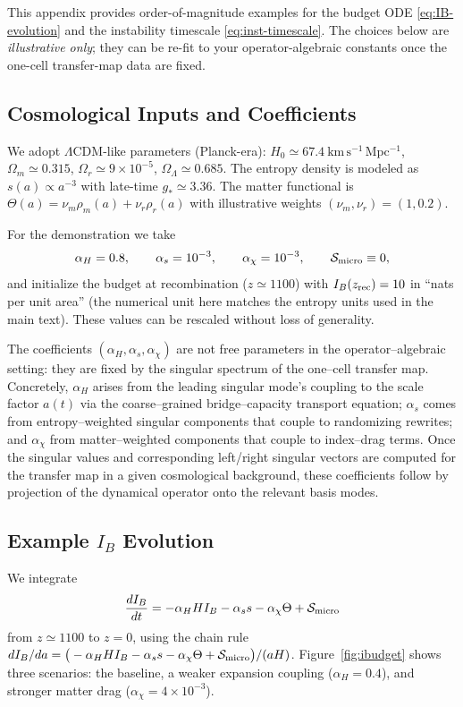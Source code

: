 \documentclass[11pt]{article}
\theoremstyle{plain}
\theoremstyle{definition}
\begin{document}
This appendix provides order-of-magnitude examples for the budget ODE \eqref{eq:IB-evolution} and the instability timescale \eqref{eq:inst-timescale}. The choices below are \emph{illustrative only}; they can be re-fit to your operator-algebraic constants once the one-cell transfer-map data are fixed.

\subsection{Cosmological Inputs and Coefficients}
We adopt $\Lambda$CDM-like parameters (Planck-era): $H_0\simeq 67.4\ \mathrm{km\,s^{-1}\,Mpc^{-1}}$, $\Omega_m\simeq 0.315$, $\Omega_r\simeq 9\times10^{-5}$, $\Omega_\Lambda\simeq 0.685$. The entropy density is modeled as $s(a)\propto a^{-3}$ with late-time $g_\ast\simeq 3.36$. The matter functional is $\Theta(a)=\nu_m \rho_m(a)+\nu_r \rho_r(a)$ with illustrative weights $(\nu_m,\nu_r)=(1,0.2)$.

For the demonstration we take
\[
  \alpha_H=0.8,\qquad \alpha_s=10^{-3},\qquad \alpha_\chi=10^{-3},\qquad \mathcal{S}_{\rm micro}\equiv 0,
\]
and initialize the budget at recombination ($z\simeq 1100$) with $I_B(z_{\rm rec})=10$ in ``nats per unit area'' (the numerical unit here matches the entropy units used in the main text). These values can be rescaled without loss of generality.

The coefficients $(\alpha_H,\alpha_s,\alpha_\chi)$ are not free parameters in the operator–algebraic setting: they are fixed by the singular spectrum of the one–cell transfer map.
Concretely, $\alpha_H$ arises from the leading singular mode’s coupling to the scale factor $a(t)$ via the coarse–grained bridge–capacity transport equation; $\alpha_s$ comes from entropy–weighted singular components that couple to randomizing rewrites; and $\alpha_\chi$ from matter–weighted components that couple to index–drag terms.
Once the singular values and corresponding left/right singular vectors are computed for the transfer map in a given cosmological background, these coefficients follow by projection of the dynamical operator onto the relevant basis modes.

\subsection{Example $I_B$ Evolution}
We integrate
\[
  \frac{d I_B}{dt}=-\alpha_H H I_B - \alpha_s s - \alpha_\chi \Theta + \mathcal{S}_{\rm micro}
\]
from $z\simeq 1100$ to $z=0$, using the chain rule $dI_B/da = \big(-\alpha_H H I_B - \alpha_s s - \alpha_\chi \Theta + \mathcal{S}_{\rm micro}\big)/(aH)$.
Figure~\ref{fig:ibudget} shows three scenarios: the baseline, a weaker expansion coupling ($\alpha_H=0.4$), and stronger matter drag ($\alpha_\chi=4\times 10^{-3}$).
\end{document}
